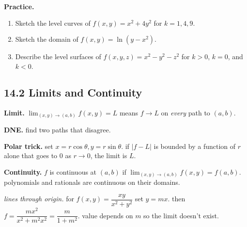 \documentclass[12pt]{article}
\theoremstyle{compact}
\begin{document}
\begin{center}
\end{center}

\medskip\textbf{Practice.}
\begin{enumerate}[noitemsep]
  \item Sketch the level curves of $f(x,y)=x^2+4y^2$ for $k=1,4,9$.
  \item Sketch the domain of $f(x,y)=\ln(y-x^2)$.
  \item Describe the level surfaces of $f(x,y,z)=x^2-y^2-z^2$ for $k>0$, $k=0$, and $k<0$.
\end{enumerate}

\subsection{14.2 Limits and Continuity}

\textbf{Limit.} $\lim_{(x,y)\to(a,b)}f(x,y)=L$ means $f\to L$ on \emph{every} path to $(a,b)$.

\textbf{DNE.} find two paths that disagree.

\textbf{Polar trick.} set $x=r\cos\theta,y=r\sin\theta$. if $|f-L|$ is bounded by a function of $r$ alone that goes to $0$ as $r\to 0$, the limit is $L$.

\textbf{Continuity.} $f$ is continuous at $(a,b)$ if $\lim_{(x,y)\to(a,b)}f(x,y)=f(a,b)$. polynomials and rationals are continuous on their domains.

\textit{lines through origin.} for $f(x,y)=\dfrac{xy}{x^2+y^2}$ set $y=mx$. then $f=\dfrac{mx^2}{x^2+m^2x^2}=\dfrac{m}{1+m^2}$. value depends on $m$ so the limit doesn't exist.
\end{document}
